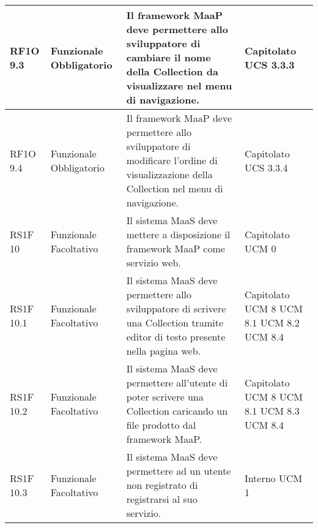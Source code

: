 \begin{center}
\begin{longtable}{ | l | p{2cm} | p{5cm} | p{1.7cm} |}
				RF1O 9.3 & Funzionale \newline  Obbligatorio  & Il framework MaaP deve permettere allo sviluppatore di cambiare il nome della Collection da visualizzare nel menu di navigazione. &  Capitolato \newline  UCS 3.3.3 \newline  \\ \hline      
				RF1O 9.4 & Funzionale \newline  Obbligatorio  & Il framework MaaP deve permettere allo sviluppatore di modificare l’ordine di visualizzazione della Collection nel menu di navigazione. &  Capitolato \newline  UCS 3.3.4 \newline  \\ \hline      
				RS1F 10 & Funzionale \newline  Facoltativo  & Il sistema MaaS deve mettere a disposizione il framework MaaP come servizio web. &  Capitolato \newline  UCM 0 \newline  \\ \hline      
				RS1F 10.1 & Funzionale \newline  Facoltativo  & Il sistema MaaS deve permettere allo sviluppatore di scrivere una Collection tramite editor di testo presente nella pagina web. &  Capitolato \newline  UCM 8 \newline  UCM 8.1 \newline  UCM 8.2 \newline  UCM 8.4 \newline  \\ \hline      
				RS1F 10.2 & Funzionale \newline  Facoltativo  & Il sistema MaaS deve permettere all’utente di poter scrivere una Collection caricando un file prodotto dal framework MaaP. &  Capitolato \newline  UCM 8 \newline  UCM 8.1 \newline  UCM 8.3 \newline  UCM 8.4 \newline  \\ \hline      
				RS1F 10.3 & Funzionale \newline  Facoltativo  & Il sistema MaaS deve permettere ad un utente non registrato di registrarsi al suo servizio. &  Interno \newline  UCM 1 \newline  \\ \hline      

\end{longtable}
\end{center}
